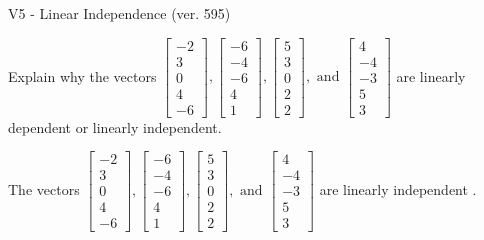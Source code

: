 \begin{exercise}
  \begin{exerciseTitle}V5 - Linear Independence (ver. 595)\end{exerciseTitle}
  \begin{exerciseStatement}
    Explain why the vectors \(\left[\begin{array}{r}
-2 \\
3 \\
0 \\
4 \\
-6
\end{array}\right] , \left[\begin{array}{r}
-6 \\
-4 \\
-6 \\
4 \\
1
\end{array}\right] , \left[\begin{array}{r}
5 \\
3 \\
0 \\
2 \\
2
\end{array}\right] , \text{ and } \left[\begin{array}{r}
4 \\
-4 \\
-3 \\
5 \\
3
\end{array}\right]\) are linearly dependent or linearly independent.	


  \end{exerciseStatement}
  \begin{exerciseAnswer}
   The vectors \(\left[\begin{array}{r}
-2 \\
3 \\
0 \\
4 \\
-6
\end{array}\right] , \left[\begin{array}{r}
-6 \\
-4 \\
-6 \\
4 \\
1
\end{array}\right] , \left[\begin{array}{r}
5 \\
3 \\
0 \\
2 \\
2
\end{array}\right] , \text{ and } \left[\begin{array}{r}
4 \\
-4 \\
-3 \\
5 \\
3
\end{array}\right]\) are 
  	 linearly independent  .
  


  \end{exerciseAnswer}
\end{exercise}